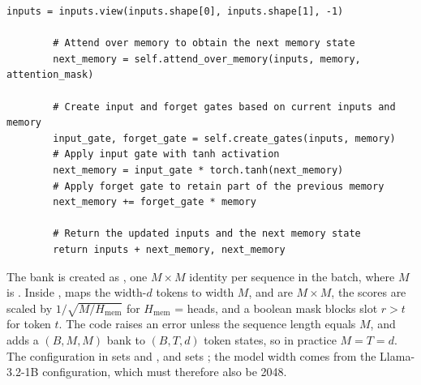 \begin{lstlisting}[caption={Excerpt from \texttt{repos/convergence-ai\_\_lm2/src/memory.py} (\texttt{MemoryModule.forward}).},label={lst:c10-lm2-mem}]
        inputs = inputs.view(inputs.shape[0], inputs.shape[1], -1)

        # Attend over memory to obtain the next memory state
        next_memory = self.attend_over_memory(inputs, memory, attention_mask)

        # Create input and forget gates based on current inputs and memory
        input_gate, forget_gate = self.create_gates(inputs, memory)
        # Apply input gate with tanh activation
        next_memory = input_gate * torch.tanh(next_memory)
        # Apply forget gate to retain part of the previous memory
        next_memory += forget_gate * memory

        # Return the updated inputs and the next memory state
        return inputs + next_memory, next_memory
\end{lstlisting}

\begin{implnote}[title={In the code: shapes and the $N = T = d$ constraint}]
The bank is created as , one $M \times M$ identity
per sequence in the batch, where $M$ is . Inside ,
 maps the width-$d$ tokens to width $M$,  and 
are $M \times M$, the scores are scaled by $1/\sqrt{M/H_{\mathrm{mem}}}$ for
$H_{\mathrm{mem}}$ =  heads, and a boolean mask  blocks
slot $r > t$ for token $t$. The code raises an error unless the sequence length equals $M$, and
 adds a $(B, M, M)$ bank to $(B, T, d)$ token states, so in practice
$M = T = d$. The configuration in 
sets  and , and
 sets ; the model
width comes from the Llama-3.2-1B configuration, which must therefore also be 2048.
\end{implnote}

